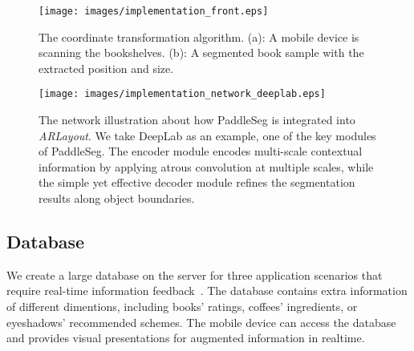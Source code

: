 \begin{figure}[htp]
    \texttt{[image: images/implementation\_front.eps]}
    \caption{
        The coordinate transformation algorithm. 
        (a): A mobile device is scanning the bookshelves.
        (b): A segmented book sample with the extracted position and size. %
    }
    \label{fig:implementation_front}
\end{figure}


\begin{figure*}[htp]
    \centering
    \texttt{[image: images/implementation\_network\_deeplab.eps]}
    \caption{
    The network illustration about how PaddleSeg is integrated into \textit{ARLayout}.
    We take DeepLab as an example, one of the key modules of PaddleSeg.
    The encoder module encodes multi-scale contextual information by
    applying atrous convolution at multiple scales, while the simple yet effective decoder
    module refines the segmentation results along object boundaries.
    }
    \label{fig:implementation_network_deeplab}
\end{figure*}


\subsection{Database}

We create a large database on the server for
three application scenarios that
require real-time information feedback~\cite{Mcauley2015, He2016}.
The database contains extra information of different dimentions, including books' ratings, 
coffees' ingredients, or eyeshadows' recommended schemes.
The mobile device can access the database and provides visual presentations for augmented information in realtime.

